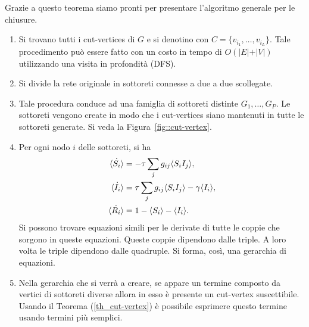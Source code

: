 Grazie a questo teorema siamo pronti per presentare l'algoritmo generale per le chiusure.
\begin{enumerate}
	\item Si trovano tutti i cut-vertices di $G$ e si denotino con $C=\{ v_{i_1}, \dots, v_{i_L}\}$. Tale procedimento pu\`o essere fatto con  un costo in tempo di $O(\vert E \vert + \vert V \vert)$ utilizzando una visita in profondit\`a (DFS). 
	\item Si divide la rete originale in sottoreti connesse a due a due scollegate.
	\item Tale procedura conduce ad una famiglia di sottoreti distinte $G_1, \dots, G_P$. Le sottoreti vengono create in modo che i cut-vertices siano mantenuti in tutte le sottoreti generate. Si veda la Figura~\ref{fig::cut-vertex}.
	\item Per ogni nodo $i$ delle sottoreti, si ha 
	\begin{equation*}
	\begin{aligned}
\dot{\langle S_i \rangle} &= -\tau \sum_j g_{ij} \langle S_iI_j \rangle,\\
\dot{\langle I_i \rangle} &= \tau \sum_j g_{ij} \langle S_iI_j \rangle-\gamma\langle I_i \rangle,\\
\dot{\langle R_i \rangle} &= 1 -\langle S_i \rangle -\langle I_i \rangle.
		\end{aligned}
	\end{equation*}
	Si possono trovare  equazioni simili per le derivate di tutte le coppie che sorgono in queste equazioni. Queste coppie dipendono dalle triple. A loro volta le triple dipendono dalle quadruple. Si forma, cos\`i, una gerarchia di equazioni.
	\item Nella gerarchia che si verr\`a a creare, se appare un termine composto da  vertici di sottoreti diverse allora in esso \`e presente un cut-vertex suscettibile. Usando il Teorema (\ref{th_cut-vertex}) \`e possibile esprimere questo termine usando termini pi\`u semplici.
\end{enumerate}
\newpage
